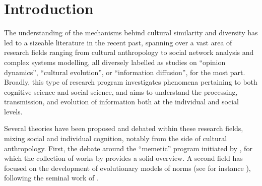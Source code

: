 \section{Introduction} %

The understanding of the mechanisms behind cultural similarity and diversity has led to a sizeable literature in the recent past, spanning over a vast area of research fields ranging from cultural anthropology to social network analysis and complex systems modelling, all diversely labelled as studies on ``opinion dynamics'', ``cultural evolution'', or ``information diffusion'', for the most part.
Broadly, this type of research program investigates phenomena pertaining to both cognitive science and social science, and aims to understand the processing, transmission, and evolution of information both at the individual and social levels.

Several theories have been proposed and debated within these research fields, mixing social and individual cognition, notably from the side of cultural anthropology.
First, the debate around the ``memetic'' program initiated by \citet{Dawkins76}, for which the collection of works by \citet{Aunger00} provides a solid overview.
A second field has focused on the development of evolutionary models of norms (see for instance \citealp{Ehrlich05}), following the seminal work of \citet{Boyd85}. 

